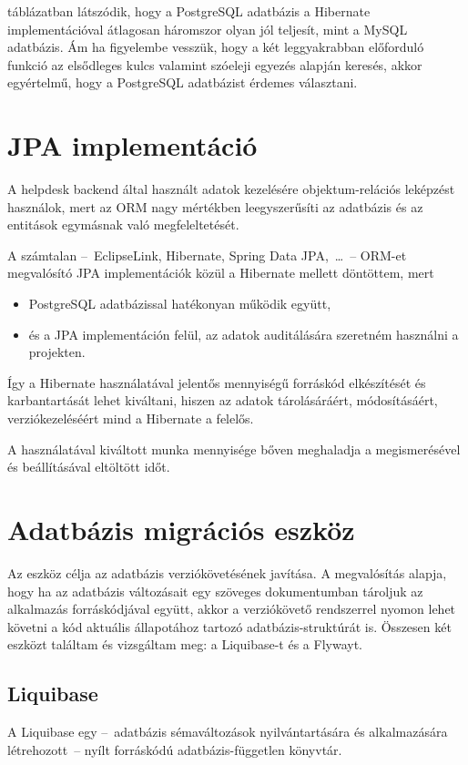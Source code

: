  táblázatban látszódik, hogy a PostgreSQL adatbázis a Hibernate implementációval átlagosan háromszor olyan jól teljesít, mint a MySQL adatbázis. Ám ha figyelembe vesszük, hogy a két leggyakrabban előforduló funkció az elsődleges kulcs valamint szóeleji egyezés alapján keresés, akkor egyértelmű, hogy a PostgreSQL adatbázist érdemes választani.


\section{JPA implementáció}
A helpdesk backend által használt adatok kezelésére objektum-relációs leképzést használok, mert az ORM nagy mértékben leegyszerűsíti az adatbázis és az entitások egymásnak való megfeleltetését.


A számtalan --~EclipseLink, Hibernate, Spring Data JPA,~\dots~--   ORM-et megvalósító JPA implementációk közül a Hibernate mellett döntöttem, mert
\begin{itemize}
	\item PostgreSQL adatbázissal hatékonyan működik együtt,
	\item és a JPA implementáción felül, az adatok auditálására szeretném használni a projekten.
\end{itemize}

Így a Hibernate használatával jelentős mennyiségű forráskód elkészítését és karbantartását lehet kiváltani, hiszen az adatok tárolásáráért, módosításáért, verziókezeléséért mind a Hibernate a felelős.

A használatával kiváltott munka mennyisége bőven meghaladja a megismerésével és beállításával eltöltött időt.


\section{Adatbázis migrációs eszköz}
Az eszköz célja az adatbázis verziókövetésének javítása. A megvalósítás alapja, hogy ha az adatbázis változásait egy szöveges dokumentumban tároljuk az alkalmazás forráskódjával együtt, akkor a verziókövető rendszerrel nyomon lehet követni a kód aktuális állapotához tartozó adatbázis-struktúrát is. Összesen két eszközt találtam és vizsgáltam meg: a Liquibase-t és a Flywayt.

\subsection{Liquibase}
A Liquibase egy --~adatbázis sémaváltozások nyilvántartására és alkalmazására létrehozott~--   nyílt forráskódú adatbázis-független könyvtár.
	
